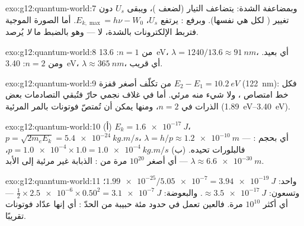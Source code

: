 \begin{solution}{exo:g12:quantum-world:7}
وبمضاعفة الشدة: يتضاعف التيار (لضعف )، ويبقى $U_s$
دون تغيير ( لكل  هي نفسها). وبرفع : يرتفع $U_s$،
$E_{k,\max} = h\nu - W_0$. أما الصورة الموجية فتربط  الإلكترونات
بالشدة، لا  --- وهو بالضبط ما \emph{لا} يُرصد.
\end{solution}

\begin{solution}{exo:g12:quantum-world:8}
من $n = 1$: \qty{13.6}{eV}، $\lambda = 1240/13.6 \approx
\qty{91}{nm}$، أي  بعيد. ومن $n = 2$: \qty{3.40}{eV}،
$\lambda \approx \qty{365}{nm}$، أي  قريب.
\end{solution}

\begin{solution}{exo:g12:quantum-world:9}
من  تكلّف أصغر قفزة $E_2 - E_1 =
\qty{10.2}{eV}$ (\qty{122}{nm}): فكل خط امتصاص
، ولا شيء منه مرئي. أما في غلاف نجمي حارّ فتُبقي التصادمات
بعض الذرات في $n = 2$، ومنها يمكن أن تُمتصّ فوتونات بالمر المرئية
(\qtyrange{1.89}{3.40}{eV}).
\end{solution}

\begin{solution}{exo:g12:quantum-world:10}
(أ) $E_k = \qty{1.6e-17}{J}$، $p = \sqrt{2m_e E_k} =
\qty{5.4e-24}{kg.m/s}$، $\lambda = h/p \approx \qty{1.2e-10}{m}$ ---
أي بحجم : فالبلورات تحيده. (ب) $p = \num{1.0e-4} \times 1.0 =
\qty{1.0e-4}{kg.m/s}$، $\lambda \approx \qty{6.6e-30}{m}$ --- أي أصغر $10^{20}$
مرة من :  الذبابة غير مرئية إلى الأبد.
\end{solution}

\begin{solution}{exo:g12:quantum-world:11}
 واحد: $\num{1.99e-25}/\num{5.05e-7} = \qty{3.94e-19}{J}$؛ وتسعون:
$\approx \qty{3.5e-17}{J}$. والبعوضة: $\tfrac12 \times \num{2.5e-6}
\times 0.50^2 = \qty{3.1e-7}{J}$ --- أي أكثر $10^{10}$ مرة. فالعين
تعمل في حدود مئة حبيبة من الحدّ : أي إنها عدّاد فوتونات
تقريبًا.
\end{solution}

